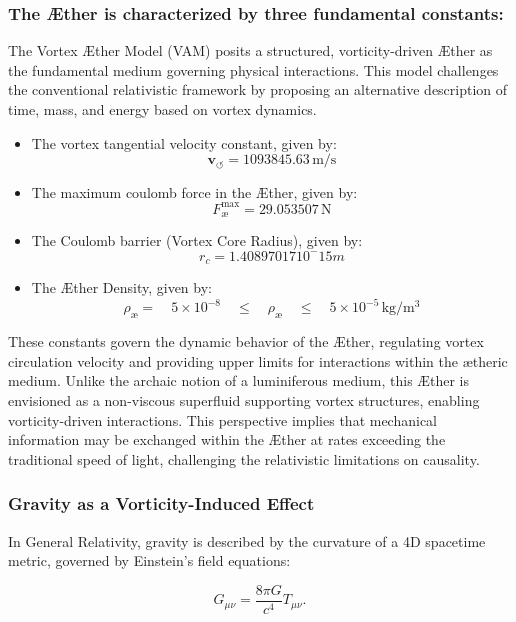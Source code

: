 \subsubsection*{The Æther is characterized by three fundamental constants:}\label{subsec:the-ae-ther-is-characterized-by-three-fundamental-constants:}

The Vortex Æther Model (VAM) posits a structured, vorticity-driven Æther as the fundamental medium governing physical interactions.
This model challenges the conventional relativistic framework by proposing an alternative description of time, mass, and energy based on vortex dynamics.

\begin{itemize}
    \item The vortex tangential velocity constant, given by: \[\mathbf{v}_{\scriptscriptstyle\boldsymbol{\circlearrowleft}} = 1093845.63 \, \mathrm{m/s}\]
    \item The maximum coulomb force in the Æther, given by:\[F^{\text{max}}_{\text{\ae}} = 29.053507 \, \mathrm{N}\]
    \item The Coulomb barrier (Vortex Core Radius), given by: \[r_c = 1.40897017 10^-15 m\]
    \item The Æther Density, given by: \[\rho_\text{\ae} = \quad 5 \times 10^{-8} \quad \leq \quad \rho_\text{\ae} \quad \leq \quad 5 \times 10^{-5} \, \mathrm{kg/m^3}\]
\end{itemize}

These constants govern the dynamic behavior of the Æther, regulating vortex circulation velocity and providing upper limits for interactions within the ætheric medium.
Unlike the archaic notion of a luminiferous medium, this Æther is envisioned as a non-viscous superfluid supporting vortex structures, enabling vorticity-driven interactions.
This perspective implies that mechanical information may be exchanged within the Æther at rates exceeding the traditional speed of light, challenging the relativistic limitations on causality.


    \subsubsection*{Gravity as a Vorticity-Induced Effect}

    In General Relativity, gravity is described by the curvature of a 4D spacetime metric, governed by Einstein's field equations:

    \begin{equation*}
        G_{\mu\nu} = \frac{8\pi G}{c^4} T_{\mu\nu}.
    \end{equation*}


